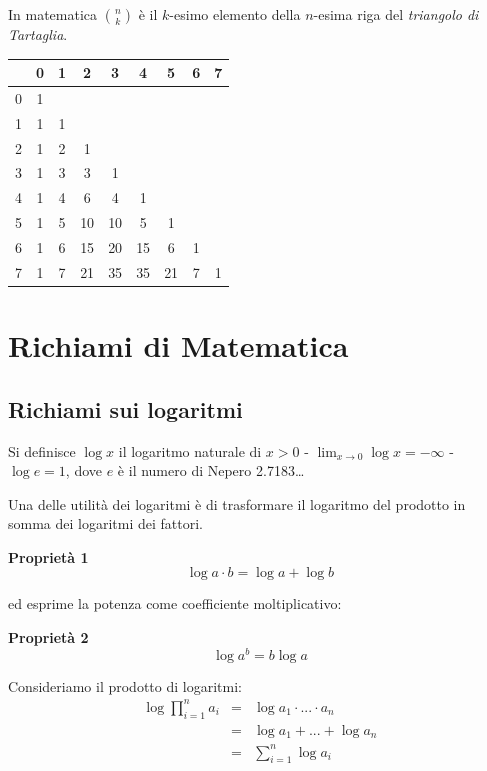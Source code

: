 \documentclass[
  11pt,
]{book}
\theoremstyle{mytheoremstyle}
\theoremstyle{mydefstyle}
\begin{document}
In matematica \(\binom{n}{ k}\) è il \(k\)-esimo elemento della \(n\)-esima riga del \emph{triangolo di Tartaglia}.

\begin{tabular}{lcccccccc}
\toprule
  & 0 & 1 & 2 & 3 & 4 & 5 & 6 & 7\\
\midrule
0 & 1 &  &  &  &  &  &  & \\
1 & 1 & 1 &  &  &  &  &  & \\
2 & 1 & 2 & 1 &  &  &  &  & \\
3 & 1 & 3 & 3 & 1 &  &  &  & \\
4 & 1 & 4 & 6 & 4 & 1 &  &  & \\
5 & 1 & 5 & 10 & 10 & 5 & 1 &  & \\
6 & 1 & 6 & 15 & 20 & 15 & 6 & 1 & \\
7 & 1 & 7 & 21 & 35 & 35 & 21 & 7 & 1\\
\bottomrule
\end{tabular}

\chapter{Richiami di Matematica}\label{richiami-di-matematica}

\section{Richiami sui logaritmi}\label{richiami-sui-logaritmi}

Si definisce \(\log x\) il logaritmo naturale di \(x>0\)
- \(\lim_{x\to 0}\log x = -\infty\)
- \(\log e = 1\), dove \(e\) è il numero di Nepero 2.7183\ldots{}

Una delle utilità dei logaritmi è di trasformare il logaritmo del prodotto
in somma dei logaritmi dei fattori.

\textbf{Proprietà 1}
\[\log a\cdot b=\log a + \log b\]

ed esprime la potenza come coefficiente moltiplicativo:

\textbf{Proprietà 2}
\[\log a^b=b\log a\]

Consideriamo il prodotto di logaritmi:
\begin{eqnarray*}
 \log \prod_{i=1}^n a_i &=& \log a_1\cdot...\cdot a_n\\
                       &=& \log a_1+...+\log a_n\\
                       &=& \sum_{i=1}^n \log a_i
\end{eqnarray*}
\end{document}
